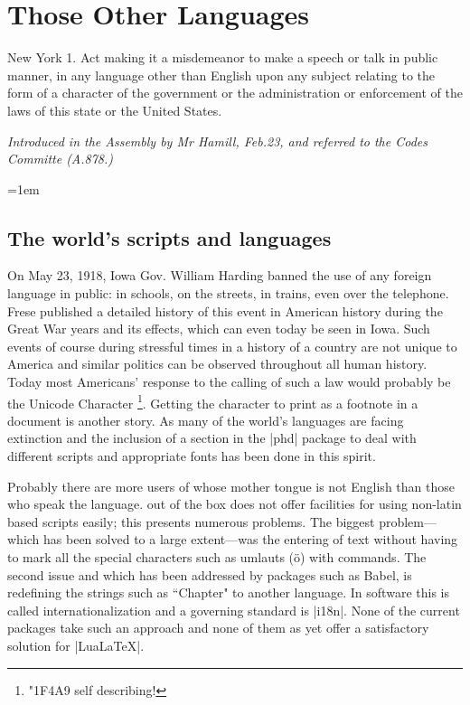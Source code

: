 \newfontfamily{}

\chapter{Those Other Languages}
\label{ch:languages}

\epigraph{New York 1. Act making it a misdemeanor to make a speech or talk in public manner, in any language other than English upon any subject relating to the form of a character of the government or the administration or enforcement of the laws of this state or the United States.}{\itshape Introduced in the Assembly by Mr Hamill, Feb.23, and referred to the Codes Committe (A.878.)}

\parindent=1em



\section{The world's scripts and languages}


On May 23, 1918, Iowa Gov. William Harding banned the use of any foreign language in public: in schools, on the streets, in trains, even over the telephone. Frese   published a detailed history of this event in American history during the Great War years and its effects, which can even today be seen in Iowa. Such events of course during stressful times in a history of a country are not unique to America and similar politics can be observed throughout all human history. Today most Americans' response to the calling of such a law would probably be the Unicode Character \footnote{\protect\emoji\protect\char"1F4A9 self describing!}. Getting the character to print as a footnote in a document is another story. As many of the world's languages are facing extinction and the inclusion of a section in the |phd| package to deal with different scripts and appropriate fonts has been done in this spirit.

 
Probably there are more users of \latexe whose mother tongue is not English than those who speak the language. \tex out of the box does not offer facilities for using non-latin based scripts easily; this presents numerous problems. The biggest problem---which has been solved to a large extent---was the entering of text without having to mark all the special
characters such as umlauts (\"o) with commands. The second issue and which has been addressed by packages such as Babel, is redefining the strings such as ``Chapter" to another language. In software this is called internationalization and a governing standard is |i18n|. None of the current packages take such an approach and none of them as yet offer a satisfactory solution for |LuaLaTeX|. 


